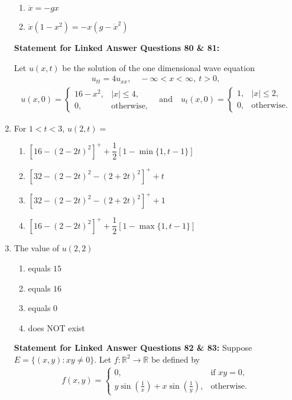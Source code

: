 \documentclass[journal]{IEEEtran}
\numberwithin{equation}{enumi}
\numberwithin{figure}{enumi}
\begin{document}
\begin{enumerate}
\begin{enumerate}
    \item $\ddot{x} = -g x$ 
    \item $\ddot{x}(1 - x^2) = -x(g - \dot{x}^2)$
    
\end{enumerate}

\newpage

\textbf{Statement for Linked Answer Questions 80 \& 81:}

Let $u(x,t)$ be the solution of the one dimensional wave equation
\begin{align*}
u_{tt} = 4u_{xx}, \quad -\infty < x < \infty,\ t > 0,
\end{align*}
\begin{align*}
u(x,0) =
\begin{cases}
16 - x^2, & |x| \leq 4, \\
0, & \text{otherwise},
\end{cases}
\quad \text{and} \quad
u_t(x,0) =
\begin{cases}
1, & |x| \leq 2, \\
0, & \text{otherwise}.
\end{cases}
\end{align*}

\item For $1 < t < 3$, $u(2,t) =$   \hfill{}
\begin{enumerate}
    \item $\left[16 - (2 - 2t)^2\right]^+ + \dfrac{1}{2}\left[1 - \min\{1, t - 1\}\right]$
    \item $\left[32 - (2 - 2t)^2 - (2 + 2t)^2\right]^+ + t$
    \item $\left[32 - (2 - 2t)^2 - (2 + 2t)^2\right]^+ + 1$
    \item $\left[16 - (2 - 2t)^2\right]^+ + \dfrac{1}{2}\left[1 - \max\{1, t - 1\}\right]$
\end{enumerate}



\item The value of $u(2,2)$         \hfill{}
\begin{enumerate}
    \item equals $15$
    \item equals $16$
    \item equals $0$
    \item does NOT exist
\end{enumerate}

\bigskip

\textbf{Statement for Linked Answer Questions 82 \& 83:}
\bigskip
Suppose $E = \{(x, y): xy \ne 0\}$. Let $f: \mathbb{R}^2 \rightarrow \mathbb{R}$ be defined by  
\begin{align*}
f(x, y) =
\begin{cases}
0, & \text{if } xy = 0, \\
y \sin\left(\frac{1}{x}\right) + x \sin\left(\frac{1}{y}\right), & \text{otherwise}.
\end{cases}
\end{align*}


\end{enumerate}
\end{document}
